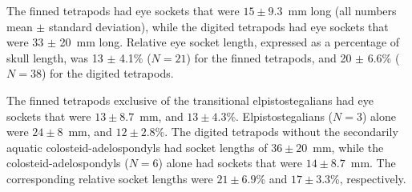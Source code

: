 The finned tetrapods had eye sockets that were $15 \pm 9.3$~mm long (all numbers mean $\pm$ standard deviation), while the digited tetrapods had eye sockets that were 33 $\pm$ 20~mm long. Relative eye socket length, expressed as a percentage of skull length, was 13 $\pm$ 4.1\% ($N=21$) for the finned tetrapods, and 20 $\pm$  6.6\% ($N=38$) for the digited tetrapods.

The finned tetrapods exclusive of the transitional elpistostegalians had eye sockets that were $13 \pm 8.7$~mm, and  $13 \pm 4.3$\%. Elpistostegalians ($N=3$) alone were $24 \pm 8$~mm, and $12 \pm 2.8$\%. The digited tetrapods without the secondarily aquatic colosteid-adelospondyls had socket lengths of $36 \pm 20$~mm, while the colosteid-adelospondyls ($N=6$) alone had sockets that were $14 \pm 8.7$~mm. The corresponding relative socket lengths were $21 \pm 6.9$\% and $17 \pm 3.3$\%, respectively.

